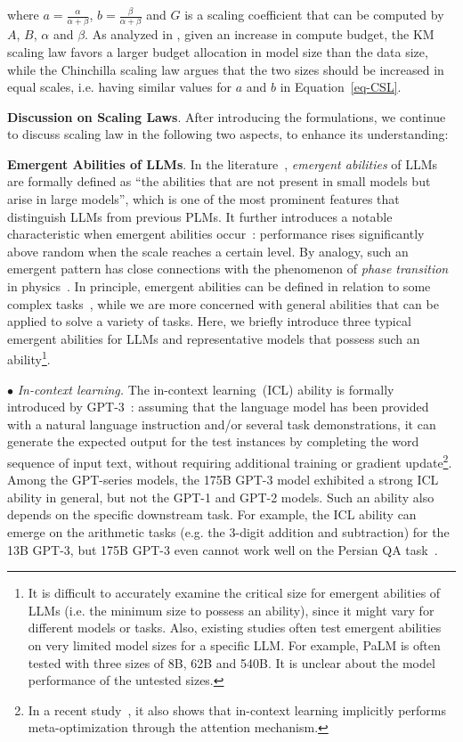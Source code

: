  where $a=\frac{\alpha}{\alpha+\beta}$,  $b=\frac{\beta}{\alpha+\beta}$ and $G$ is a scaling coefficient that can be computed by $A$, $B$, $\alpha$ and $\beta$. As analyzed in \cite{Hoffmann-arxiv-2022-Training}, given an increase in compute budget, the KM scaling law favors a larger budget allocation in model size than the data size, while the Chinchilla scaling law argues that the two sizes should be increased in equal scales, i.e. having similar values for $a$ and $b$ in Equation~\eqref{eq-CSL}. 

\textbf{Discussion on Scaling Laws}. After introducing the formulations, we continue to discuss scaling law in the following two aspects, to enhance its understanding: 

\textbf{Emergent Abilities of LLMs}.  In the literature~\cite{Wei-arxiv-2022-Emergent}, \emph{emergent abilities} of LLMs are formally defined as ``the abilities that are not present in small models but arise in large models'',  which is one of the most prominent features that distinguish LLMs from previous PLMs. It further introduces a notable characteristic when emergent abilities occur~\cite{Wei-arxiv-2022-Emergent}:  performance rises significantly above random when the scale reaches a certain level. By analogy, such an emergent pattern has close connections with the phenomenon of  \emph{phase transition} in physics~\cite{Wei-arxiv-2022-Emergent,Huberman-AI-1987-phase}. In principle, emergent abilities can be  defined in relation to some complex tasks~\cite{Rae-arxiv-2021-Scaling,Wei-arxiv-2022-Emergent}, while we are more concerned with general abilities that can be applied to solve a variety of  tasks. Here, we briefly introduce three typical emergent abilities for LLMs and  representative models that possess such an ability\footnote{It is difficult to accurately examine the critical size for emergent abilities of LLMs (i.e. the minimum size to possess an ability), since it might vary for different models or tasks. Also, existing studies often test emergent abilities on very limited model sizes for a specific LLM. For example, PaLM is often tested with three sizes of 8B, 62B and 540B. It is unclear about the model performance of the untested  sizes.}. 

$\bullet$ \emph{In-context learning.} {The in-context learning~(ICL) ability is formally introduced by GPT-3~\cite{Brown-NeurIPS-2020-Language}: assuming that the language model has been provided with a natural language instruction and/or  several task demonstrations, it can generate the expected output for the test instances by completing the word sequence of input text, without requiring additional training or gradient update\footnote{In a recent study~\cite{Dai-arxiv-2022-Why}, it also shows that in-context learning implicitly performs meta-optimization through the attention mechanism.}.} Among the GPT-series models, the 175B GPT-3 model exhibited a strong ICL ability in general, but not the GPT-1 and GPT-2 models. Such an ability also depends on the specific downstream task. For example, the ICL ability can emerge on the arithmetic tasks (e.g. the 3-digit addition and subtraction) for the 13B GPT-3, but 175B GPT-3 even cannot work well on the Persian QA task~\cite{Wei-arxiv-2022-Emergent}.

